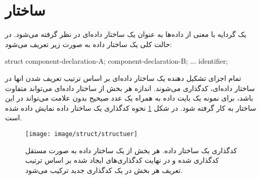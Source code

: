 
\section{ساختار}

یک گردایه با معنی از داده‌ها به عنوان یک ساختار داده‌ای در نظر گرفته می‌شود.
در حالت کلی یک ساختار داده به صورت زیر تعریف می‌شود:

\begin{C++}
 struct {
    component-declaration-A;
    component-declaration-B;
    ...
 } identifier;
\end{C++}

تمام اجزای تشکیل دهنده یک ساختار داده‌ای بر اساس ترتیب تعریف شدن انها در ساختار
داده‌ای، کدگذاری می‌شوند.
اندازه هر بخش از ساختار داده‌ای می‌تواند متفاوت باشد، برای نمونه یک بایت داده به
همراه یک عدد صیحیح بدون علامت می‌تواند در این ساختار به کار گرفته شود.
در شکل \ref{image/struct/structuer} نحوه کدگذاری یک ساختار داده نمایش داده شده
است.

% 

\begin{figure}
\centering
\texttt{[image: image/struct/structuer]}
\caption[کدگذاری یک ساختار داده]{
	کدگذاری یک ساختار داده. هر بخش از یک ساختار داده به صورت مستقل کدگذاری شده و در
	نهایت کدگذاری‌های ایجاد شده بر اساس ترتیب تعریف هر بخش در یک کدگذاری جدید ترکیب
	می‌شود.
}
\label{image/struct/structuer}
\end{figure}


